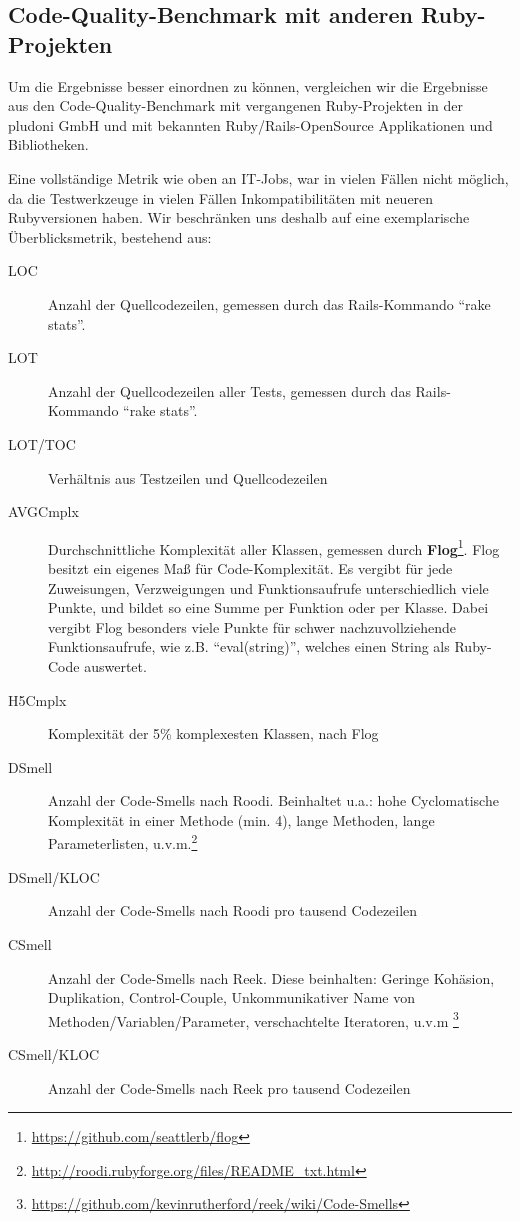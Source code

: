 

\subsection{Code-Quality-Benchmark mit anderen Ruby-Projekten}

Um die Ergebnisse besser einordnen zu können, vergleichen wir die Ergebnisse aus den Code-Quality-Benchmark mit vergangenen Ruby-Projekten in der pludoni GmbH und mit bekannten Ruby/Rails-OpenSource Applikationen und Bibliotheken.

Eine vollständige Metrik wie oben an IT-Jobs, war in vielen Fällen nicht möglich, da die Testwerkzeuge in vielen Fällen Inkompatibilitäten mit neueren Rubyversionen haben. Wir beschränken uns deshalb auf eine exemplarische Überblicksmetrik, bestehend aus:

\begin{description}
 \item[LOC] Anzahl der Quellcodezeilen, gemessen durch das Rails-Kommando "`rake stats"'. 
 \item[LOT] Anzahl der Quellcodezeilen aller Tests, gemessen durch das Rails-Kommando "`rake stats"'. 
 \item[LOT/TOC] Verhältnis aus Testzeilen und Quellcodezeilen
 \item[AVGCmplx] Durchschnittliche Komplexität aller Klassen, gemessen durch \textbf{Flog}\footnote{\url{https://github.com/seattlerb/flog}}. Flog besitzt ein eigenes Maß für Code-Komplexität. Es vergibt für jede Zuweisungen, Verzweigungen und Funktionsaufrufe unterschiedlich viele Punkte, und bildet so eine Summe per Funktion oder per Klasse. Dabei vergibt Flog besonders viele Punkte für schwer nachzuvollziehende Funktionsaufrufe, wie z.B. "`eval(string)"', welches einen String als Ruby-Code auswertet.
 \item[H5Cmplx] Komplexität der 5\% komplexesten Klassen, nach Flog
 \item[DSmell] Anzahl der Code-Smells nach Roodi. Beinhaltet u.a.: hohe Cyclomatische Komplexität in einer Methode (min. 4), lange Methoden, lange Parameterlisten, u.v.m.\footnote{\url{http://roodi.rubyforge.org/files/README_txt.html}}
 \item[DSmell/KLOC] Anzahl der Code-Smells nach Roodi pro tausend Codezeilen
 \item[CSmell] Anzahl der Code-Smells nach Reek. Diese beinhalten: Geringe Kohäsion, Duplikation, Control-Couple, Unkommunikativer Name von Methoden/Variablen/Parameter, verschachtelte Iteratoren, u.v.m  \footnote{\url{https://github.com/kevinrutherford/reek/wiki/Code-Smells}}
 \item[CSmell/KLOC] Anzahl der Code-Smells nach Reek pro tausend Codezeilen
\end{description}








